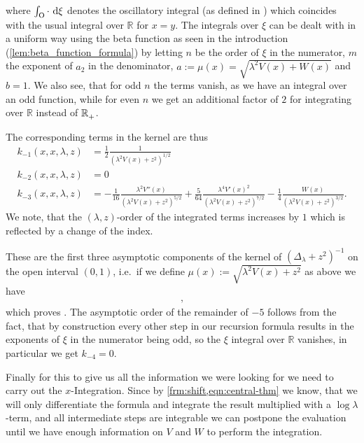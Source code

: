 where $\int_{\mathrm O}^{}\!\,\cdot\,\,\mathrm d{\xi}$ denotes the oscillatory integral (as defined in
\cite[Def.~1.1]{Shu:POS}) which coincides with the usual integral over
$\mathbb{R}$ for $x = y$. The integrals over $\xi$ can be dealt with in a
uniform way using the beta function as seen in the introduction
(\cref{lem:beta_function_formula}) by letting $n$ be the order of $\xi$ in the
numerator, $m$ the exponent of $a_2$ in the denominator, $a := \mu(x) =
\sqrt{\lambda^2 V(x) + W(x)}$ and $b = 1$. We also see, that for odd $n$ the
terms vanish, as we have an integral over an odd function, while for even $n$ we
get an additional factor of $2$ for integrating over $\mathbb{R}$ instead of
${\mathbb{R}_+^{}}$.

The corresponding terms in the kernel are thus
\begin{equation}
  \begin{split}
    k_{-1}(x,x,\lambda,z) &= \frac{1}{2} \frac{1}{(\lambda^2 V(x) + z^2)^{1/2}} \\
    k_{-2}(x,x,\lambda,z) &= 0 \\
    k_{-3}(x,x,\lambda,z) &= - \frac{1}{16} \frac{\lambda^2 V''(x)}{(\lambda^2
      V(x) + z^2)^{5/2}} + \frac{5}{64} \frac{\lambda^4 V'(x)^2}{(\lambda^2V(x)
      + z^2)^{7/2}} -\frac{1}{4}\frac{W(x)}{(\lambda^2 V(x) + z^2)^{3/2}}.
    \end{split}
  \label{eqn:coeff-kernel}
\end{equation}
We note, that the $(\lambda,z)$-order of the integrated terms increases by $1$
which is reflected by a change of the index.

These are the first three asymptotic components of the kernel of
$(\Delta_\lambda + z^2)^{-1}$ on the open interval $(0,1)$, i.e.\ if we define
$\mu(x) := \sqrt{\lambda^2 V(x) + z^2}$ as above we have
\begin{align*}
  ,
\end{align*}
which proves . The asymptotic order of the remainder of
$-5$ follows from the fact, that by construction every other step in our
recursion formula results in the exponents of $\xi$ in the numerator being odd,
so the $\xi$ integral over $\mathbb{R}$ vanishes, in particular we get $k_{-4} =
0$.

Finally for this to give us all the information we were looking for we need to
carry out the $x$-Integration. Since by \cref{frm:shift,eqn:central-thm} we
know, that we will only differentiate the formula and integrate the result
multiplied with a $\log\lambda$-term, and all intermediate steps are integrable
we can postpone the evaluation until we have enough information on $V$ and $W$
to perform the integration.

